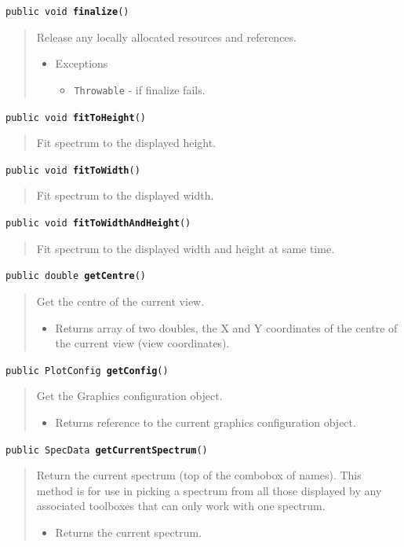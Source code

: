 \documentclass[twoside,11pt]{article}
\renewcommand{\_}{\texttt{\symbol{95}}}
\newcommand{\method}[1]{\texttt{#1}}
\newenvironment{desc}{\begin{quote}}{\end{quote}}
\begin{document}
\method{public void \textbf{finalize}()\label{l150}\label{l151}}
\begin{desc}Release any locally allocated resources and references.
\begin{itemize}
\item{{Exceptions}
  \begin{itemize}
   \item{\vspace{-.6ex}\texttt{Throwable} - if finalize fails.}
  \end{itemize}
}
\end{itemize}
\end{desc}

\method{public void \textbf{fitToHeight}()\label{l152}\label{l153}}
\begin{desc}Fit spectrum to the displayed height.
\end{desc}

\method{public void \textbf{fitToWidth}()\label{l154}\label{l155}}
\begin{desc}Fit spectrum to the displayed width.
\end{desc}

\method{public void \textbf{fitToWidthAndHeight}()\label{l156}\label{l157}}
\begin{desc}Fit spectrum to the displayed width and height at same time.
\end{desc}

\method{public double \textbf{getCentre}()\label{l158}\label{l159}}
\begin{desc}Get the centre of the current view.
\begin{itemize}
\item{Returns array of two doubles, the X and Y coordinates of the
 centre of the current view (view coordinates). }
\end{itemize}
\end{desc}

\method{public PlotConfig \textbf{getConfig}()\label{l160}\label{l161}}
\begin{desc}Get the Graphics configuration object.
\begin{itemize}
\item{Returns reference to the current graphics configuration object. }
\end{itemize}
\end{desc}

\method{public SpecData \textbf{getCurrentSpectrum}()\label{l162}\label{l163}}
\begin{desc}Return the current spectrum (top of the combobox of names).
 This method is for use in picking a spectrum from all those
 displayed by any associated toolboxes that can only work with
 one spectrum.
\begin{itemize}
\item{Returns the current spectrum. }
\end{itemize}
\end{desc}
\end{document}

